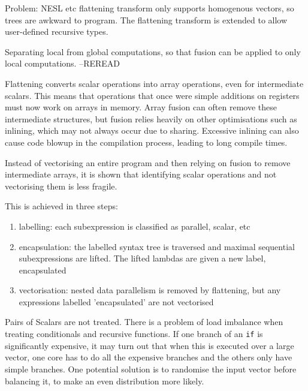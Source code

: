 


Problem: NESL etc flattening transform only supports homogenous vectors, so trees are awkward to program.
The flattening transform is extended to allow user-defined recursive types.

Separating local from global computations, so that fusion can be applied to only local computations.
--REREAD


Flattening converts scalar operations into array operations, even for intermediate scalars.
This means that operations that once were simple additions on registers must now work on arrays in memory.
Array fusion can often remove these intermediate structures, but fusion relies heavily on other optimisations such as inlining,
which may not always occur due to sharing. Excessive inlining can also cause code blowup in the compilation process,
leading to long compile times.

Instead of vectorising an entire program and then relying on fusion to remove intermediate arrays,
it is shown that identifying scalar operations and not vectorising them is less fragile.

This is achieved in three steps:
\begin{enumerate}
\item labelling: each subexpression is classified as parallel, scalar, etc
\item encapsulation: the labelled syntax tree is traversed and maximal sequential subexpressions are lifted.
The lifted lambdas are given a new label, encapsulated
\item vectorisation: nested data parallelism is removed by flattening, but any expressions labelled 'encapsulated' are not vectorised
\end{enumerate}

Pairs of Scalars are not treated.
There is a problem of load imbalance when treating conditionals and recursive functions.
If one branch of an \verb/if/ is significantly expensive, it may turn out that when this is executed over a large vector,
one core has to do all the expensive branches and the others only have simple branches.
One potential solution is to randomise the input vector before balancing it, to make an even distribution more likely.


